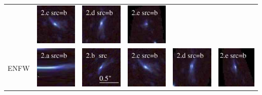 \documentclass[useAMS,usenatbib]{mn2e}
\begin{document}
\begin{table}
\begin{tabular}{cccccc}
    & \multicolumn{1}{m{1.7cm}}{\includegraphics[height=2.00cm,clip]{figs/nsie_img/rgb.pre_2_c_b_tri.ps}}
    & \multicolumn{1}{m{1.7cm}}{\includegraphics[height=2.00cm,clip]{figs/nsie_img/rgb.pre_2_d_b_tri.ps}}
    & \multicolumn{1}{m{1.7cm}}{\includegraphics[height=2.00cm,clip]{figs/nsie_img/rgb.pre_2_e_b_tri.ps}} \\
    \multicolumn{1}{m{1cm}}{{\Large ENFW}}
    & \multicolumn{1}{m{1.7cm}}{\includegraphics[height=2.00cm,clip]{figs/enfw_img/rgb.pre_2_a_b_tri.ps}}
    & \multicolumn{1}{m{1.7cm}}{\includegraphics[height=2.00cm,clip]{figs/enfw_img/rgb.src_2_b.ps}}
    & \multicolumn{1}{m{1.7cm}}{\includegraphics[height=2.00cm,clip]{figs/enfw_img/rgb.pre_2_c_b_tri.ps}}
    & \multicolumn{1}{m{1.7cm}}{\includegraphics[height=2.00cm,clip]{figs/enfw_img/rgb.pre_2_d_b_tri.ps}}
    & \multicolumn{1}{m{1.7cm}}{\includegraphics[height=2.00cm,clip]{figs/enfw_img/rgb.pre_2_e_b_tri.ps}} \\
  \end{tabular}

\end{table}
\end{document}
